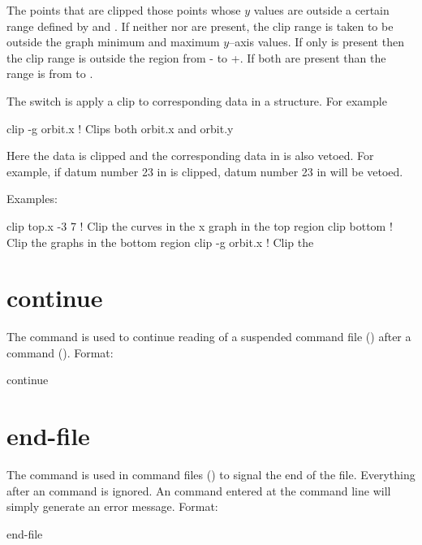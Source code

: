 The points that are clipped those points whose $y$ values are outside
a certain range defined by  and . If neither
 nor  are present, the clip range is taken
to be outside the graph minimum and maximum $y$--axis values. If only
 is present then the clip range is outside the region
from - to +. If both are present than the
range is from  to .

The  switch is apply a clip to corresponding data in a 
structure. For example
\begin{example}
  clip -g orbit.x   ! Clips both orbit.x and orbit.y 
\end{example}
Here the  data is clipped and the corresponding data in
 is also vetoed. For example, if datum number 23 in
 is clipped, datum number 23 in  will be
vetoed.

Examples:
\begin{example}
  clip top.x -3  7  ! Clip the curves in the x graph in the top region
  clip bottom       ! Clip the graphs in the bottom region
  clip -g orbit.x   ! Clip the 
\end{example}

\section{continue}
\label{s:continue}

The  command is used to continue reading of a suspended
command file () after a  command
(). Format:
\begin{example}
  continue
\end{example}

\section{end-file} \label{s:end.file}

The  command is used in command files
() to signal the end of the file. Everything
after an  command is ignored. An  command
entered at the command line will simply generate an error message.
Format:
\begin{example}
  end-file
\end{example}

